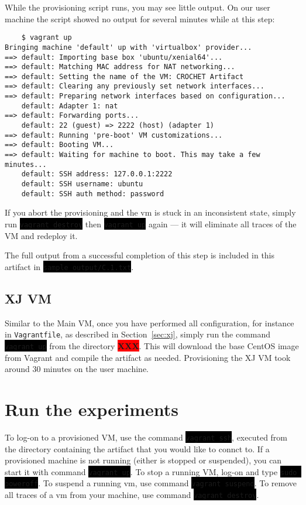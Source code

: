 \documentclass[12pt]{article}
\newcommand{\command}[1]{\colorbox{black}{\texttt{\color{white}#1}}}
\newcommand{\host}[1]{\colorbox{blue!20}{\texttt{\color{black}#1}}}
\newcommand{\XXX}{\colorbox{red}{\bf\color{white}XXX}}
\begin{document}
While the provisioning script runs, you may see little output. On our user machine the script showed no output for several minutes while at this step:
\begin{verbatim}
	$ vagrant up
Bringing machine 'default' up with 'virtualbox' provider...
==> default: Importing base box 'ubuntu/xenial64'...
==> default: Matching MAC address for NAT networking...
==> default: Setting the name of the VM: CROCHET Artifact
==> default: Clearing any previously set network interfaces...
==> default: Preparing network interfaces based on configuration...
    default: Adapter 1: nat
==> default: Forwarding ports...
    default: 22 (guest) => 2222 (host) (adapter 1)
==> default: Running 'pre-boot' VM customizations...
==> default: Booting VM...
==> default: Waiting for machine to boot. This may take a few minutes...
    default: SSH address: 127.0.0.1:2222
    default: SSH username: ubuntu
    default: SSH auth method: password
\end{verbatim}

If you abort the provisioning and the vm is stuck in an inconsistent state, simply run \command{vagrant destroy} then \command{vagrant up} again --- it will eliminate all traces of the VM and redeploy it.

The full output from a successful completion of this step is included in this artifact in \command{sample\_output/C.1.txt}.

\subsection{XJ VM}

Similar to the Main VM, once you have performed all configuration, for instance in  \host{Vagrantfile}, as described in Section~\ref{sec:xj}, simply
run the command \command{vagrant up} from the directory \XXX.  This will download the base CentOS image from Vagrant and compile the artifact as needed. Provisioning the
XJ VM took around 30 minutes on the user machine.

\section{Run the experiments}
\label{sec:run}

To log-on to a provisioned VM, use the command \command{vagrant ssh}, executed from the directory containing the artifact that you would like to connct to.  If a provisioned
machine is not running (either is stopped or suspended), you can start it with
command \command{vagrant up}.  To stop a running VM, log-on and type \command{sudo
poweroff}.  To suspend a running vm, use command \command{vagrant suspend}. To remove all traces of a vm from your machine, use command \command{vagrant destroy}.
\end{document}
